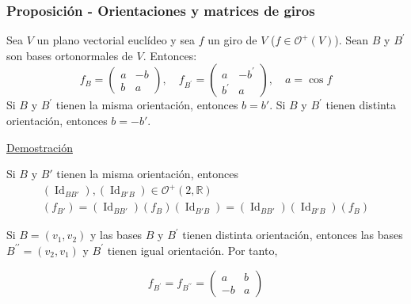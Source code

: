 \documentclass[12pt, a4paper, ones, notitlepage, openany,titlepage]{article}
\newcommand{\demostracion}{\noindent\underline{Demostración}}
\begin{document}
\subsubsection{Proposición - Orientaciones y matrices de giros}
Sea $V$ un plano vectorial euclídeo y sea $f$ un giro de $V$ ($f \in \mathcal{O}^+(V)$). Sean $B$ y $B^{\prime}$ son bases ortonormales de $V$. Entonces:
$$
f_{B}=\left(\begin{array}{rr}
	a & -b \\
	b & a
\end{array}\right), \quad f_{B^{\prime}}=\left(\begin{array}{rr}
	a & -b^{\prime} \\
	b^{\prime} & a
\end{array}\right), \quad a = \operatorname{cos}f
$$
Si $B$ y $B^{\prime}$ tienen la misma orientación, entonces $b = b'$. Si $B$ y $B^{\prime}$ tienen distinta orientación, entonces $b = -b'$.

\demostracion

Si $B$ y $B'$ tienen la misma orientación, entonces
\begin{gather*}
	(\operatorname{Id}_{BB'}),(\operatorname{Id}_{B'B}) \in \mathcal{O}^+(2,\mathbb{R}) \\
	(f_{B'}) = (\operatorname{Id}_{BB'})(f_{B})(\operatorname{Id}_{B'B})
	= (\operatorname{Id}_{BB'})(\operatorname{Id}_{B'B})(f_B)
\end{gather*}

Si $B=\left(v_{1}, v_{2}\right)$ y las bases $B$ y $B^{\prime}$ tienen distinta orientación, entonces las bases $B^{\prime \prime}=\left(v_{2}, v_{1}\right)$ y $B^{\prime}$ tienen igual orientación. Por tanto,

$$
f_{B^{\prime}}=f_{B^{\prime \prime}}=\left(\begin{array}{rr}
	a & b \\
	-b & a
\end{array}\right)
$$
\end{document}
